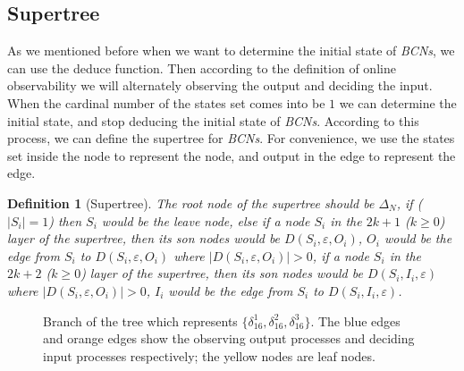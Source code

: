 \documentclass[conference]{IEEEtran} %
\newtheorem{definition}{Definition}
\begin{document}
\subsection{Supertree} As we mentioned before when we want to determine the initial state of {\em BCNs}, we can use the deduce function. Then according to the definition of online observability we will alternately observing the output and deciding the input. When the  cardinal number of the states set comes into be $1$ we can determine the initial state, and stop deducing the initial state of {\em BCNs}. According to this process, we can define the supertree for {\em BCNs}. For convenience, we use the states set inside the node to represent the node, and output in the edge to represent the edge.
\begin{definition}[Supertree]
The root node of the supertree should be $\Delta_N$, if ($|S_i|=1$) then $S_i$ would be the leave node, else if a node $S_i$ in the $2k + 1$ ($k\ge 0$) layer of the supertree, then its son nodes would be $D\left(S_i,\varepsilon, O_i\right)$, $O_i$ would be the edge from $S_i$ to $D\left(S_i,\varepsilon, O_i\right)$ where $|D\left(S_i,\varepsilon, O_i\right)|>0$, if a node $S_i$ in the $2k + 2$ ($k\ge 0$) layer of the supertree, then its son nodes would be $D\left(S_i,I_i,\varepsilon\right)$ where $|D\left(S_i,\varepsilon, O_i\right)|>0$, $I_i$ would be the edge from $S_i$ to $D\left(S_i,I_i,\varepsilon\right)$. 
\end{definition}

  \begin{figure}[thpb]
      \centering
      
      \caption{Branch of the tree which represents $\{\delta_{16}^1,\delta_{16}^2,\delta_{16}^3\}$. The blue edges and orange edges show the observing output processes and deciding input processes respectively; the yellow nodes are leaf nodes.}
      \label{fig:3}
   \end{figure}
\end{document}
